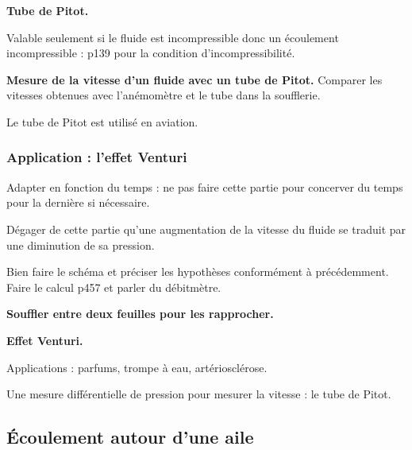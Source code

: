 \begin{slide}
\textbf{Tube de Pitot.}
\end{slide}

\begin{remarque}
Valable seulement si le fluide est incompressible donc un écoulement incompressible : \cite{Guyon2001} p139 pour la condition d'incompressibilité.
\end{remarque}

\begin{experience}
\textbf{Mesure de la vitesse d'un fluide avec un tube de Pitot.}
Comparer les vitesses obtenues avec l'anémomètre et le tube dans la soufflerie.
\end{experience}

\begin{transition}
Le tube de Pitot est utilisé en aviation.
\end{transition}

\subsubsection{Application : l'effet Venturi}

Adapter en fonction du temps : ne pas faire cette partie pour concerver du temps pour la dernière si nécessaire.

Dégager de cette partie qu'une augmentation de la vitesse du fluide se traduit par une diminution de sa pression.

Bien faire le schéma et préciser les hypothèses conformément à précédemment.
Faire le calcul \cite{Olivier2000} p457 et parler du débitmètre.

\begin{experience}
\textbf{Souffler entre deux feuilles pour les rapprocher.}
\end{experience}

\begin{slide}
\textbf{Effet Venturi.}
\end{slide}

Applications : parfums, trompe à eau, artériosclérose.

\begin{transition}
Une mesure différentielle de pression pour mesurer la vitesse : le tube de Pitot.
\end{transition}

\subsection{Écoulement autour d'une aile}


